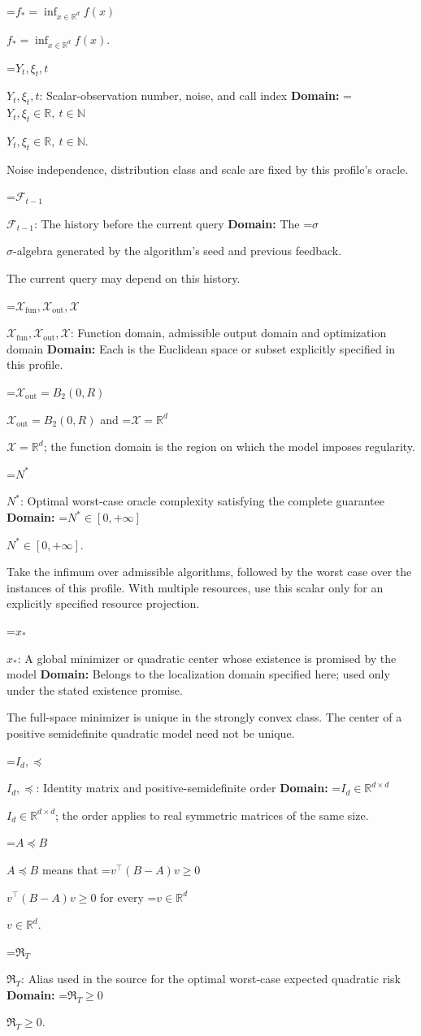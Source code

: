 \documentclass[10pt,a4paper]{article}
\newcommand{\AtlasMath}[1]{\par\begingroup\centering\setbox0=\hbox{$\displaystyle #1$}\ifdim\wd0>1.4\linewidth\typeout{ATLAS WIDE FORMULA: \the\wd0}\fi\ifdim\wd0>\linewidth\resizebox{\linewidth}{!}{\box0}\else\box0\fi\par\endgroup}
\newcommand{\AtlasInlineMath}[1]{\begingroup\setbox0=\hbox{$#1$}\ifdim\wd0>.4\linewidth\endgroup\AtlasMath{#1}\else\endgroup$#1$\fi}
\begin{document}
\AtlasInlineMath{f_*=\inf_{x\in \mathbb{R}^d}f(x)}.

\AtlasInlineMath{Y_t,\xi_t,t}: Scalar-observation number, noise, and call index \textbf{Domain:} \AtlasInlineMath{Y_t,\xi_t\in\mathbb{R},\ t\in\mathbb{N}}.

Noise independence, distribution class and scale are fixed by this profile's oracle.

\AtlasInlineMath{\mathcal{F}_{t-1}}: The history before the current query \textbf{Domain:} The \AtlasInlineMath{\sigma}-algebra generated by the algorithm's seed and previous feedback.

The current query may depend on this history.

\AtlasInlineMath{\mathcal{X}_{\mathrm{fun}},\mathcal{X}_{\mathrm{out}},\mathcal{X}}: Function domain, admissible output domain and optimization domain \textbf{Domain:} Each is the Euclidean space or subset explicitly specified in this profile.

\AtlasInlineMath{\mathcal{X}_{\mathrm{out}}=B_2(0,R)} and \AtlasInlineMath{\mathcal{X}=\mathbb{R}^d}; the function domain is the region on which the model imposes regularity.

\AtlasInlineMath{N^*}: Optimal worst-case oracle complexity satisfying the complete guarantee \textbf{Domain:} \AtlasInlineMath{N^*\in[0,+\infty]}.

Take the infimum over admissible algorithms, followed by the worst case over the instances of this profile. With multiple resources, use this scalar only for an explicitly specified resource projection.

\AtlasInlineMath{x_*}: A global minimizer or quadratic center whose existence is promised by the model \textbf{Domain:} Belongs to the localization domain specified here; used only under the stated existence promise.

The full-space minimizer is unique in the strongly convex class. The center of a positive semidefinite quadratic model need not be unique.

\AtlasInlineMath{I_d,\preceq}: Identity matrix and positive-semidefinite order \textbf{Domain:} \AtlasInlineMath{I_d\in\mathbb{R}^{d\times d}}; the order applies to real symmetric matrices of the same size.

\AtlasInlineMath{A\preceq B} means that \AtlasInlineMath{v^\top(B-A)v\ge0} for every \AtlasInlineMath{v\in\mathbb{R}^d}.

\AtlasInlineMath{\mathfrak R_T}: Alias used in the source for the optimal worst-case expected quadratic risk \textbf{Domain:} \AtlasInlineMath{\mathfrak R_T\ge0}.
\end{document}
